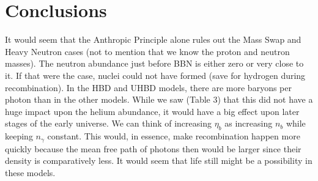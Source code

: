 \documentclass[aps,reprint,prl]{revtex4-1}
\begin{document}
\section*{Conclusions}
It would seem that the Anthropic Principle alone rules out the Mass Swap and Heavy Neutron cases (not to mention that we know the proton and neutron masses).  The neutron abundance just before BBN is either zero or very close to it.  If that were the case, nuclei could not have formed (save for hydrogen during recombination).  In the HBD and UHBD models, there are more baryons per photon than in the other models.  While we saw (Table 3) that this did not have a huge impact upon the helium abundance, it would have a big effect upon later stages of the early universe.  We can think of increasing $\eta_b$ as increasing $n_b$ while keeping $n_\gamma$ constant.  This would, in essence, make recombination happen more quickly because the mean free path of photons then would be larger since their density is comparatively less.  It would seem that life still might be a possibility in these models.
\\ \\ \\ \\ \\ \\ \\ \\ %



\end{document}
